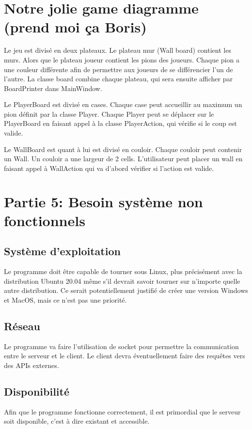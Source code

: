 \documentclass[utf8]{article}
\begin{document}
\tableofcontents

\newpage


\section{Notre jolie game diagramme (prend moi ça Boris)}

Le jeu est divisé en deux plateaux. Le plateau mur (Wall board) contient les murs. Alors que le plateau joueur contient les pions des
joueurs. Chaque pion a une couleur différente afin de permettre aux joueurs de se différencier l'un de l'autre. La classe board combine
chaque plateau, qui sera ensuite afficher par BoardPrinter dans MainWindow. 

Le PlayerBoard est divisé en cases. Chaque case peut accueillir au maximum un pion définit par la classe Player. Chaque Player peut
se déplacer sur le PlayerBoard en faisant appel à la classe PlayerAction, qui vérifie si le coup est valide.

Le WallBoard est quant à lui est divisé en couloir. Chaque couloir peut contenir un Wall. Un couloir a une largeur de 2 cells. L'utilisateur
peut placer un wall en faisant appel à WallAction qui va d'abord vérifier si l'action est valide.

\section{Partie 5: Besoin système non fonctionnels}
\subsection{Système d'exploitation}
Le programme doit être capable de tourner sous Linux, plus précisément avec la distribution Ubuntu 20.04 même s'il devrait savoir tourner
sur n'importe quelle autre distribution.
Ce serait potentiellement justifié de créer une version Windows et MacOS, mais ce n'est pas une priorité.

\subsection{Réseau}
Le programme va faire l'utilisation de socket pour permettre la communication entre le serveur et le client. 
Le client devra éventuellement faire des requêtes vers des APIs externes.

\subsection{Disponibilité}
Afin que le programme fonctionne correctement, il est primordial que le serveur soit disponible, c'est à dire existant et accessible. 
\end{document}
